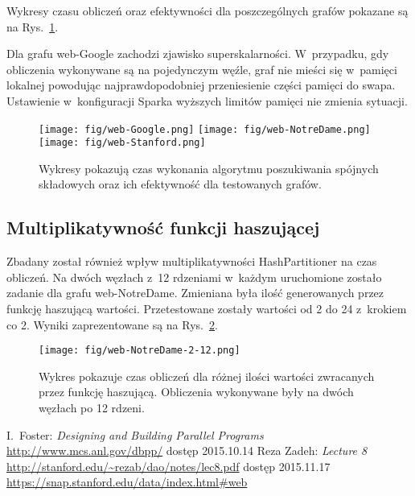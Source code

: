 \documentclass[a4paper; 12pt]{article}
\begin{document}
Wykresy czasu obliczeń oraz efektywności dla poszczególnych grafów pokazane są
na Rys.~\ref{fig:web-graphs}.

Dla grafu web-Google zachodzi zjawisko superskalarności.
W~przypadku, gdy obliczenia wykonywane są na pojedynczym węźle, graf nie mieści
się w~pamięci lokalnej powodując najprawdopodobniej przeniesienie części
pamięci do swapa.
Ustawienie w~konfiguracji Sparka wyższych limitów pamięci nie zmienia sytuacji.

\begin{figure}
    \centering
    \texttt{[image: fig/web-Google.png]}
    \texttt{[image: fig/web-NotreDame.png]}
    \texttt{[image: fig/web-Stanford.png]}
    \caption{Wykresy pokazują czas wykonania algorytmu poszukiwania spójnych
        składowych oraz ich efektywność dla testowanych grafów.}
    \label{fig:web-graphs}
\end{figure}

\subsection{Multiplikatywność funkcji haszującej}

Zbadany został również wpływ multiplikatywności HashPartitioner na czas obliczeń.
Na dwóch węzłach z~12 rdzeniami w~każdym uruchomione zostało zadanie dla
grafu web-NotreDame.
Zmieniana była ilość generowanych przez funkcję haszującą wartości.
Przetestowane zostały wartości od 2 do 24 z~krokiem co 2.
Wyniki zaprezentowane są na Rys.~\ref{fig:multiplicity}.

\begin{figure}
    \centering
    \texttt{[image: fig/web-NotreDame-2-12.png]}
    \caption{Wykres pokazuje czas obliczeń dla różnej ilości wartości
        zwracanych przez funkcję haszującą.
        Obliczenia wykonywane były na dwóch węzłach po 12 rdzeni.}
    \label{fig:multiplicity}
\end{figure}

\begin{thebibliography}{9}
        I.~Foster: \emph{Designing and Building Parallel Programs}
        \url{http://www.mcs.anl.gov/dbpp/} dostęp 2015.10.14
        Reza Zadeh: \emph{Lecture 8}
        \url{http://stanford.edu/~rezab/dao/notes/lec8.pdf} dostęp 2015.11.17
        \url{https://snap.stanford.edu/data/index.html#web}
\end{thebibliography}
\end{document}
